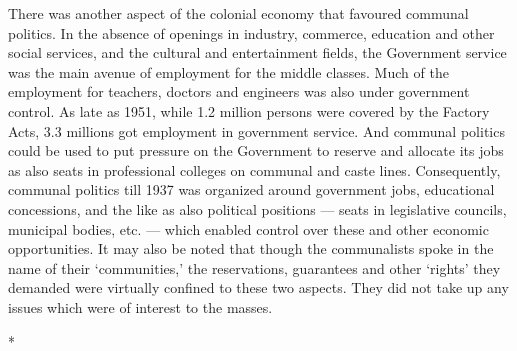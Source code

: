 There was another aspect of the colonial economy that favoured communal politics. In the absence of openings in industry, commerce, education and other social services, and the cultural and entertainment fields, the Government service was the main avenue of employment for the middle classes. Much of the employment for teachers, doctors and engineers was also under government control. As late as 1951, while 1.2 million persons were covered by the Factory Acts, 3.3 millions got employment in government service. And communal politics could be used to put pressure on the Government to reserve and allocate its jobs as also seats in professional colleges on communal and caste lines. Consequently, communal politics till 1937 was organized around government jobs, educational concessions, and the like as also political positions — seats in legislative councils, municipal bodies, etc. — which enabled control over these and other economic opportunities. It may also be noted that though the communalists spoke in the name of their `communities,' the reservations, guarantees and other `rights' they demanded were virtually confined to these two aspects. They did not take up any issues which were of interest to the masses.

\begin{center}*\end{center}

\paragraph*{}


